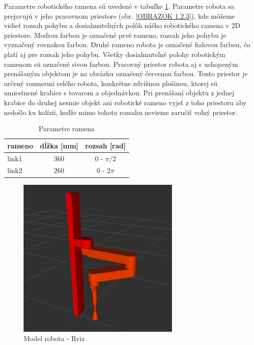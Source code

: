 Parametre robotického ramena sú uvedené v tabuľke  \ref{table 1.2}.  Parametre robota sa prejavujú v jeho pracovnom priestore (obr. \ref{OBRAZOK 1.2.3}), kde môžeme vidieť rozsah pohybu a dosiahnuteľných polôh nášho robotického ramena v 2D priestore.  Modrou farbou je označené prvé rameno, rozsah jeho pohybu je vyznačený rovnakou farbou. Druhé rameno robota je označené fialovou farbou, čo platí aj pre rozsah jeho pohybu. Všetky dosiahnuteľné polohy robotickým ramenom sú označené sivou farbou. Pracovný priestor robota aj s uchopeným prenášaným objektom je na obrázku označený červenou farbou. Tento priestor je určený rozmermi celého robota, konkrétne zdvižnou plošinou, ktorej sú umiestnené krabice s tovarom a objednávkou. Pri prenášaní objektu z jednej krabice do druhej nesmie objekt ani robotické rameno vyjsť z toho priestoru aby nedošlo ku kolízii, keďže mimo tohoto rozsahu nevieme zaručiť voľný priestor. 
\begin{table}[]
	\centering
	\begin{tabular}{|l|c|c|}
		\hline
		rameno   & \multicolumn{1}{l|}{dĺžka {[}mm{]}} & \multicolumn{1}{l|}{rozsah {[}rad{]}} \\ \hline
		link1 & 360                                 & 0 - $\pi$/2                              \\ \hline
		link2 & 260                                 & 0 - 2$\pi$                           \\ \hline
	\end{tabular}
	\caption{Parametre ramena}\label{table 1.2} 
\end{table}

\begin{figure}[]
	\centering
	\includegraphics[width=80mm]{img/SCARA2.png}
	\caption{Model robota - Rviz}\label{OBRAZOK 1.2.2} 
\end{figure} 



